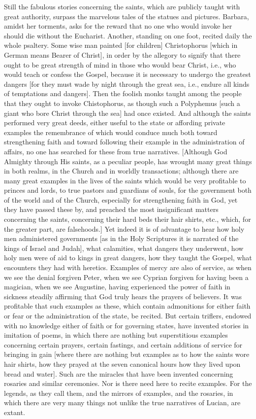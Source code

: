 Still the fabulous stories concerning the saints, which are publicly
taught with great authority, surpass the marvelous tales of the
statues and pictures.  Barbara, amidst her torments, asks for the
reward that no one who would invoke her should die without the
Eucharist.  Another, standing on one foot, recited daily the whole
psaltery.  Some wise man painted [for children] Christophorus [which
in German means Bearer of Christ], in order by the allegory to
signify that there ought to be great strength of mind in those who
would bear Christ, i.e., who would teach or confess the Gospel,
because it is necessary to undergo the greatest dangers [for they
must wade by night through the great sea, i.e., endure all kinds of
temptations and dangers].  Then the foolish monks taught among the
people that they ought to invoke Chistophorus, as though such a
Polyphemus [such a giant who bore Christ through the sea] had once
existed.  And although the saints performed very great deeds, either
useful to the state or affording private examples the remembrance of
which would conduce much both toward strengthening faith and toward
following their example in the administration of affairs, no one has
searched for these from true narratives.  [Although God Almighty
through His saints, as a peculiar people, has wrought many great
things in both realms, in the Church and in worldly transactions;
although there are many great examples in the lives of the saints
which would be very profitable to princes and lords, to true pastors
and guardians of souls, for the government both of the world and of
the Church, especially for strengthening faith in God, yet they have
passed these by, and preached the most insignificant matters
concerning the saints, concerning their hard beds their hair shirts,
etc., which, for the greater part, are falsehoods.] Yet indeed it is
of advantage to hear how holy men administered governments [as in the
Holy Scriptures it is narrated of the kings of Israel and Judah],
what calamities, what dangers they underwent, how holy men were of
aid to kings in great dangers, how they taught the Gospel, what
encounters they had with heretics.  Examples of mercy are also of
service, as when we see the denial forgiven Peter, when we see
Cyprian forgiven for having been a magician, when we see Augustine,
having experienced the power of faith in sickness steadily affirming
that God truly hears the prayers of believers.  It was profitable
that such examples as these, which contain admonitions for either
faith or fear or the administration of the state, be recited.  But
certain triflers, endowed with no knowledge either of faith or for
governing states, have invented stories in imitation of poems, in
which there are nothing but superstitious examples concerning certain
prayers, certain fastings, and certain additions of service for
bringing in gain [where there are nothing but examples as to how the
saints wore hair shirts, how they prayed at the seven canonical hours
how they lived upon bread and water].  Such are the miracles that
have been invented concerning rosaries and similar ceremonies.  Nor
is there need here to recite examples.  For the legends, as they call
them, and the mirrors of examples, and the rosaries, in which there
are very many things not unlike the true narratives of Lucian, are
extant.

